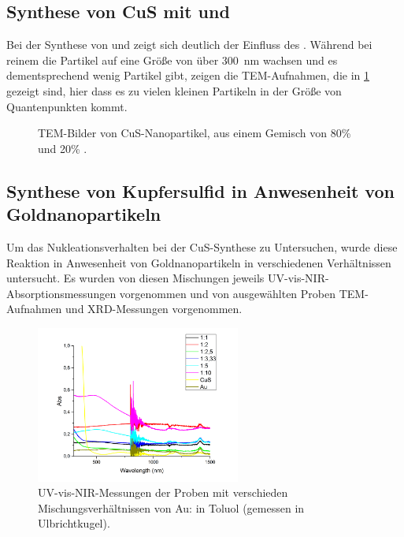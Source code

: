 	

	
	
\subsection{Synthese von CuS mit  und }

	Bei der Synthese von  und  zeigt sich deutlich der Einfluss des . 
	Während bei reinem  die Partikel auf eine Größe von über \SI{300}{\nano\meter} wachsen und es dementsprechend wenig Partikel gibt, zeigen die TEM-Aufnahmen, die in \cref{fig:TEM-CuCl} gezeigt sind, hier dass es zu vielen kleinen Partikeln in der Größe von Quantenpunkten kommt.
	
	\begin{figure}[H]
		\centering
		\caption{TEM-Bilder von CuS-Nanopartikel, aus einem Gemisch von 80\%  und 20\% .}
		\label{fig:TEM-CuCl}
	\end{figure}
	
\subsection{Synthese von Kupfersulfid in Anwesenheit von Goldnanopartikeln}

	Um das Nukleationsverhalten bei der CuS-Synthese zu Untersuchen, wurde diese Reaktion in Anwesenheit von Goldnanopartikeln in verschiedenen Verhältnissen untersucht.
	Es wurden von diesen Mischungen jeweils UV-vis-NIR-Absorptionsmessungen vorgenommen und von ausgewählten Proben TEM-Aufnahmen und XRD-Messungen vorgenommen.
	
	\begin{figure}[htbp]
		\centering
		\includegraphics[width=0.6\textwidth]{Bilder/UV-AuCu-Konz} 	
		\caption{UV-vis-NIR-Messungen der Proben mit verschieden Mischungsverhältnissen von Au: in Toluol (gemessen in Ulbrichtkugel).}
		\label{fig:UV-AuCu}
	\end{figure}
	
